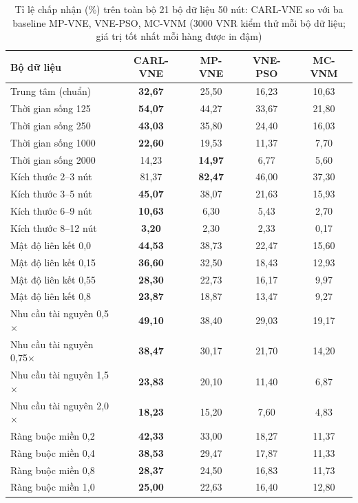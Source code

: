 \documentclass[../DoAn.tex]{subfiles}
\begin{document}
\begin{table}[H]
\centering
\caption[Tỉ lệ chấp nhận của CARL-VNE và ba baseline.]{Tỉ lệ chấp nhận (\%) trên toàn bộ 21 bộ dữ liệu 50 nút: CARL-VNE so với ba baseline MP-VNE, VNE-PSO, MC-VNM ($3000$ VNR kiểm thử mỗi bộ dữ liệu; giá trị tốt nhất mỗi hàng được in đậm)}
\label{tab:res-all}
\begin{tabular}{lcccc}
\toprule
\textbf{Bộ dữ liệu} & \textbf{CARL-VNE} & \textbf{MP-VNE} & \textbf{VNE-PSO} & \textbf{MC-VNM} \\
\midrule
Trung tâm (chuẩn)            & \textbf{32,67} & 25,50 & 16,23 & 10,63 \\
\midrule
Thời gian sống 125          & \textbf{54,07} & 44,27 & 33,67 & 21,80 \\
Thời gian sống 250          & \textbf{43,03} & 35,80 & 24,40 & 16,03 \\
Thời gian sống 1000         & \textbf{22,60} & 19,53 & 11,37 & 7,70  \\
Thời gian sống 2000         & 14,23 & \textbf{14,97} & 6,77  & 5,60  \\
\midrule
Kích thước 2--3 nút         & 81,37 & \textbf{82,47} & 46,00 & 37,30 \\
Kích thước 3--5 nút         & \textbf{45,07} & 38,07 & 21,63 & 15,93 \\
Kích thước 6--9 nút         & \textbf{10,63} & 6,30  & 5,43  & 2,70  \\
Kích thước 8--12 nút        & \textbf{3,20}  & 2,30  & 2,33  & 0,17  \\
\midrule
Mật độ liên kết 0,0         & \textbf{44,53} & 38,73 & 22,47 & 15,60 \\
Mật độ liên kết 0,15        & \textbf{36,60} & 32,50 & 18,43 & 12,93 \\
Mật độ liên kết 0,55        & \textbf{28,30} & 22,73 & 16,17 & 9,97  \\
Mật độ liên kết 0,8         & \textbf{23,87} & 18,87 & 13,47 & 9,27  \\
\midrule
Nhu cầu tài nguyên 0,5$\times$  & \textbf{49,10} & 38,40 & 29,03 & 19,17 \\
Nhu cầu tài nguyên 0,75$\times$ & \textbf{38,47} & 30,17 & 21,70 & 14,20 \\
Nhu cầu tài nguyên 1,5$\times$  & \textbf{23,83} & 20,10 & 11,40 & 6,87  \\
Nhu cầu tài nguyên 2,0$\times$  & \textbf{18,23} & 15,20 & 7,60  & 4,83  \\
\midrule
Ràng buộc miền 0,2          & \textbf{42,33} & 33,00 & 18,27 & 11,37 \\
Ràng buộc miền 0,4          & \textbf{38,53} & 29,47 & 17,87 & 11,33 \\
Ràng buộc miền 0,8          & \textbf{28,37} & 24,50 & 16,83 & 11,73 \\
Ràng buộc miền 1,0          & \textbf{25,00} & 22,63 & 16,40 & 12,80 \\
\bottomrule
\end{tabular}
\end{table}
\end{document}
